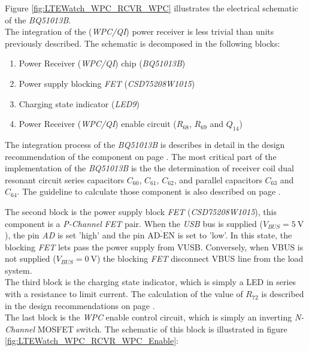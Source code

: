 \documentclass[report.tex]{subfiles}
\begin{document}
Figure \ref{fig:LTEWatch_WPC_RCVR_WPC} illustrates the electrical schematic of the \textit{BQ51013B}.\\


The integration of the (\textit{WPC/QI}) power receiver is less trivial than units previously described. The schematic is decomposed in the following blocks:
\begin{enumerate}
\item Power Receiver (\textit{WPC/QI}) chip (\textit{BQ51013B})
\item Power supply blocking \textit{FET} (\textit{CSD75208W1015})
\item Charging state indicator (\textit{LED9})
\item Power Receiver (\textit{WPC/QI}) enable circuit ($R_{68}$, $R_{69}$ and $Q_{14}$)\\
\end{enumerate}

The integration process of the \textit{BQ51013B} is describes in detail in the design recommendation of the component on page \pageref{sec:wpc_rcvr_sel}. The most critical part of the implementation of the \textit{BQ51013B} is the the determination of receiver coil dual resonant circuit series capacitors $C_{60}$, $C_{61}$, $C_{62}$, and parallel capacitors $C_{63}$ and $C_{64}$. The guideline to calculate those component is also described on page \pageref{sec:wpc_rcvr_sel}.\\

\pagebreak

The second block is the power supply block \textit{FET} (\textit{CSD75208W1015}), this component is a \textit{P-Channel} \textit{FET} pair. When the \textit{USB} bus is supplied ($V_{BUS} = \SI{+5}{\volt}$), the pin \textit{AD} is set 'high' and the pin $\overline{\text{AD-EN}}$ is set to 'low'. In this state, the blocking \textit{FET} lets pass the power supply from VUSB. Conversely, when VBUS is not supplied ($V_{BUS} = \SI{0}{\volt}$) the blocking \textit{FET} disconnect VBUS line from the load system. \\

The third block is the charging state indicator, which is simply a LED in series with a resistance to limit current. The calculation of the value of $R_{72}$ is described in the design recommendations on page \pageref{sec:wpc_rcvr_sel}.\\

The last block is the \textit{WPC} enable control circuit, which is simply an inverting \textit{N-Channel}  MOSFET switch. The schematic of this block is illustrated in figure \ref{fig:LTEWatch_WPC_RCVR_WPC_Enable}:
\end{document}
